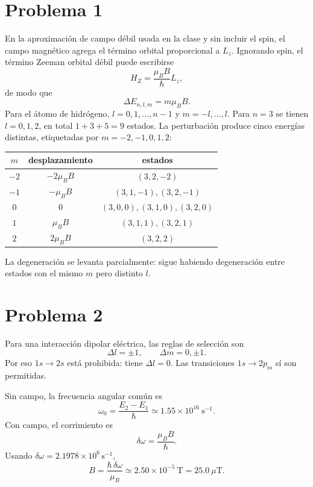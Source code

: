 \documentclass[11pt,a4paper]{article}
\numberwithin{equation}{section}
\renewcommand{\boxed}[1]{#1}
\newcommand{\hb}{\hbar}
\begin{document}
\section{Problema 1}
En la aproximación de campo débil usada en la clase y sin incluir el spin, el campo magnético agrega el término orbital proporcional a $L_z$. Ignorando spin, el término Zeeman orbital débil puede escribirse
\begin{equation}
H_Z=\frac{\mu_BB}{\hb}L_z,
\end{equation}
de modo que
\begin{equation}
\Delta E_{n,l,m}=m\mu_BB.
\end{equation}
Para el átomo de hidrógeno, $l=0,1,\ldots,n-1$ y $m=-l,\ldots,l$. Para $n=3$ se tienen $l=0,1,2$, en total $1+3+5=9$ estados. La perturbación produce cinco energías distintas, etiquetadas por $m=-2,-1,0,1,2$:
\begin{center}
\begin{tabular}{c|c|c}\toprule
$m$&desplazamiento&estados\\\midrule
$-2$&$-2\mu_BB$&$(3,2,-2)$\\
$-1$&$-\mu_BB$&$(3,1,-1),(3,2,-1)$\\
$0$&$0$&$(3,0,0),(3,1,0),(3,2,0)$\\
$1$&$\mu_BB$&$(3,1,1),(3,2,1)$\\
$2$&$2\mu_BB$&$(3,2,2)$\\\bottomrule
\end{tabular}
\end{center}
La degeneración se levanta parcialmente: sigue habiendo degeneración entre estados con el mismo $m$ pero distinto $l$.

\section{Problema 2}
Para una interacción dipolar eléctrica, las reglas de selección son
\begin{equation}
\Delta l=\pm1,\qquad \Delta m=0,\pm1.
\end{equation}
Por eso $1s\to2s$ está prohibida: tiene $\Delta l=0$. Las transiciones $1s\to2p_m$ sí son permitidas.

Sin campo, la frecuencia angular común es
\begin{equation}
\omega_0=\frac{E_2-E_1}{\hb}\simeq1.55\times10^{16}\ \mathrm{s}^{-1}.
\end{equation}
Con campo, el corrimiento es
\begin{equation}
\delta\omega=\frac{\mu_BB}{\hb}.
\end{equation}
Usando $\delta\omega=2.1978\times10^6\,\mathrm{s}^{-1}$,
\begin{equation}
\boxed{B=\frac{\hb\,\delta\omega}{\mu_B}\simeq2.50\times10^{-5}\ \mathrm T=25.0\ \mu\mathrm T.}
\end{equation}
\end{document}
